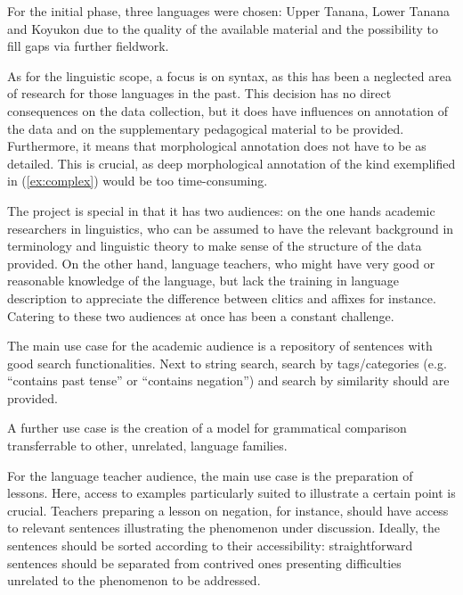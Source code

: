 \documentclass[a4paper,11pt]{article}
\begin{document}
For the initial phase, three languages were chosen: Upper Tanana, Lower Tanana and Koyukon due to the quality of the available material and the possibility to fill gaps via further fieldwork.

As for the linguistic scope, a focus is on syntax, as this has been a neglected area of research for those languages in the past. This decision has no direct consequences on the data collection, but it does have influences on annotation of the data and on the supplementary pedagogical material to be provided. Furthermore, it means that morphological annotation does not have to be as detailed. This is crucial, as deep morphological annotation of the kind exemplified in (\ref{ex:complex}) would be too time-consuming.

The project is special in that it has two audiences: on the one hands academic researchers in linguistics, who can be assumed to have the relevant background in terminology and linguistic theory to make sense of the structure of the data provided. On the other hand, language teachers, who might have very good or reasonable knowledge of the language, but lack the training in language description to appreciate the difference between clitics and affixes for instance. Catering to these two audiences at once has been a constant challenge.

The main use case for the academic audience is a repository of sentences with good search functionalities. Next to string search, search by tags/ca\-te\-gories (e.g. ``contains past tense'' or ``contains negation'') and search by similarity should are provided. 

A further use case  is the creation of a model for grammatical comparison transferrable to other, unrelated, language families. 




For the language teacher audience, the main use case is the preparation of lessons. Here, access to examples particularly suited to illustrate a certain point is crucial. Teachers preparing a lesson on negation, for instance, should have access to relevant sentences illustrating the phenomenon under discussion. Ideally, the sentences should be sorted according to their accessibility: straightforward sentences should be separated from contrived ones presenting difficulties unrelated to the phenomenon to be addressed. 



    
\end{document}
